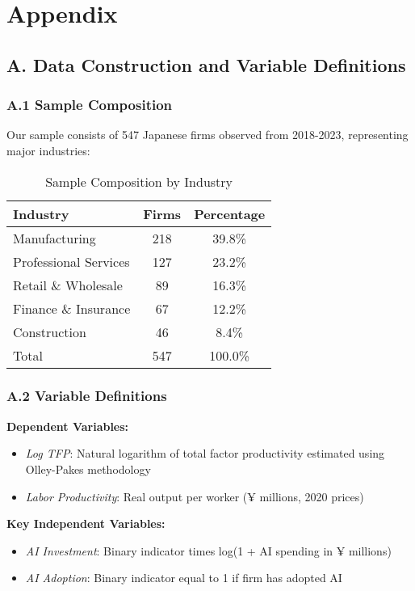 \documentclass[12pt, a4paper]{article}
\begin{document}
\newpage

\section*{Appendix}

\subsection*{A. Data Construction and Variable Definitions}

\subsubsection*{A.1 Sample Composition}

Our sample consists of 547 Japanese firms observed from 2018-2023, representing major industries:

\begin{table}[H]
\centering
\caption{Sample Composition by Industry}
\label{tab:sample_composition}
\begin{tabular}{lcc}
\toprule
Industry & Firms & Percentage \\
\midrule
Manufacturing & 218 & 39.8\% \\
Professional Services & 127 & 23.2\% \\
Retail \& Wholesale & 89 & 16.3\% \\
Finance \& Insurance & 67 & 12.2\% \\
Construction & 46 & 8.4\% \\
\midrule
Total & 547 & 100.0\% \\
\bottomrule
\end{tabular}
\end{table}

\subsubsection*{A.2 Variable Definitions}

\textbf{Dependent Variables:}
\begin{itemize}
\item \textit{Log TFP}: Natural logarithm of total factor productivity estimated using Olley-Pakes methodology
\item \textit{Labor Productivity}: Real output per worker (¥ millions, 2020 prices)
\end{itemize}

\textbf{Key Independent Variables:}
\begin{itemize}
\item \textit{AI Investment}: Binary indicator times log(1 + AI spending in ¥ millions)
\item \textit{AI Adoption}: Binary indicator equal to 1 if firm has adopted AI
\end{itemize}
\end{document}

